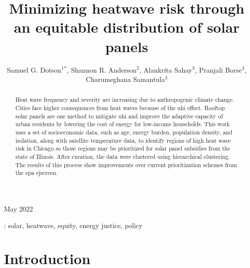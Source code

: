 \documentclass[10pt]{iopart}
\begin{document}
\title[Minimizing heatwave risk through an equitable distribution of solar panels]{Minimizing
heatwave risk through an equitable distribution of solar panels}

 \author{
 Samuel G. Dotson$^1$$^*$,
 Shannon R. Anderson$^2$,
 Alankrita Sahay$^3$,
 Pranjali Borse$^3$,
 Charumeghana Samantula$^3$
 }

 \address{ $^1$ Department of Nuclear, Plasma, and Radiological Engineering,
 University of Illinois Urbana-Champaign, Urbana IL, United States}
  \address{ $^2$ Department of  Natural Resources and Environmental Sciences,
 University of Illinois Urbana-Champaign, Urbana IL, United States}
  \address{ $^3$ Department of Civil and Environmental Engineering,
 University of Illinois Urbana-Champaign, Urbana IL, United States}
 \address{$^*$ Author to whom correspondence should be addressed}


 \begin{indented}
 \vspace{10pt}
 \item[]May 2022
 \end{indented}

 \begin{abstract}
Heat wave frequency and severity are increasing due to anthropogenic climate change.
Cities face higher consequences from heat waves because of the \ac{uhi} effect.
Rooftop solar panels are one method to mitigate \ac{uhi} and improve the adaptive
capacity of urban residents by lowering the cost of energy for low-income households.
This work uses a set of socioeconomic data, such as age, energy burden, population
density, and isolation, along with satellite temperature data, to identify regions
of high heat wave risk in Chicago so those regions may be prioritized for solar
panel subsidies from the state of Illinois. After curation, the data were clustered
using hierarchical clustering. The results of this process show improvements over
current prioritization schemes from the \ac{epa} \ac{ejscreen}. 
 \end{abstract}

 \vspace{2pc}
: solar, heatwave, equity, energy justice, policy

\ioptwocol
\acresetall

\section{Introduction}

\end{document}

